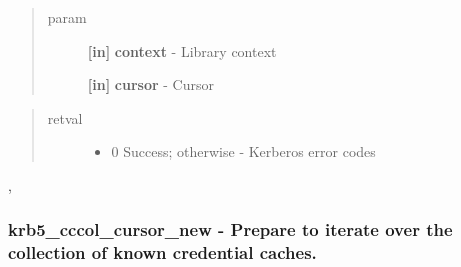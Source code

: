 \documentclass[letterpaper,10pt,english]{sphinxmanual}
\begin{document}
\begin{quote}\begin{description}
\item[{param}] \leavevmode
\textbf{{[}in{]}} \textbf{context} - Library context

\textbf{{[}in{]}} \textbf{cursor} - Cursor

\end{description}\end{quote}
\begin{quote}\begin{description}
\item[{retval}] \leavevmode\begin{itemize}
\item {} 
0   Success; otherwise - Kerberos error codes

\end{itemize}

\end{description}\end{quote}




{\hyperref[appdev/refs/api/krb5_cccol_cursor_new:krb5_cccol_cursor_new]{}} , {\hyperref[appdev/refs/api/krb5_cccol_cursor_next:krb5_cccol_cursor_next]{}}




\subsubsection{krb5\_cccol\_cursor\_new -  Prepare to iterate over the collection of known credential caches.}
\label{appdev/refs/api/krb5_cccol_cursor_new::doc}\label{appdev/refs/api/krb5_cccol_cursor_new:krb5-cccol-cursor-new-prepare-to-iterate-over-the-collection-of-known-credential-caches}

\begin{fulllineitems}
\label{appdev/refs/api/krb5_cccol_cursor_new:krb5_cccol_cursor_new}
\end{fulllineitems}
\end{document}
